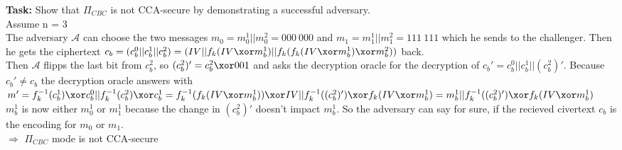 \textbf{Task:} Show that \(\Pi_{CBC}\) is not CCA-secure by demonstrating a successful adversary.  \\
Assume n = 3 \\
The adversary  \(\mathcal{A}\) can choose the two messages \(m_{0}  = m_0^1 \vert \vert m_0^2 = 000\ 000\) and  \(m_{1}  = m_1^1 \vert \vert m_1^2 = 111\ 111\) which he sends to the challenger. Then he gets the ciphertext \(c_b = (c_b^0 \vert \vert c_b^1 \vert \vert c_b^2) = (IV \vert \vert f_k(IV \xor m_b^1) \vert \vert  f_k( f_k(IV \xor m_b^1) \xor m_b^2))\) back.\\
Then \(\mathcal{A}\) flipps the last bit from \(c_b^2\), so \((c_b^2)' = c_b^2 \xor 001\) and asks the decryption oracle for the decryption of \(c_b' = c_b^0 \vert \vert c_b^1 \vert \vert (c_b^2)'\). Because \(c_b' \neq c_b\) the decryption oracle answers with \(m' = f_k^{-1}(c_b^1) \xor c_b^0 \vert \vert f_k^{-1}(c_b^2) \xor c_b^1  = f_k^{-1}(f_k(IV \xor m_b^1)) \xor IV \vert \vert f_k^{-1}((c_b^2)') \xor f_k(IV \xor m_b^1) = m_b^1 \vert \vert f_k^{-1}((c_b^2)') \xor f_k(IV \xor m_b^1)\) \\ 
\(m_b^1\) is now either \(m_0^1\) or \(m_1^1\) because the change in \((c_b^2)'\) doesn't impact \(m_b^1\). So the adversary can say for sure, if the recieved civertext \(c_b\) is the encoding for \(m_0\) or \(m_1\). \\
\(\Rightarrow\) \(\Pi_{CBC}\) mode is not CCA-secure \\
  